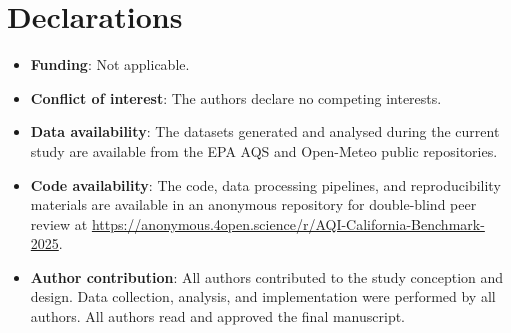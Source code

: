 \documentclass[pdflatex,sn-mathphys-num]{sn-jnl}
\begin{document}
\section*{Declarations}
\begin{itemize}
\item \textbf{Funding}: Not applicable.
\item \textbf{Conflict of interest}: The authors declare no competing interests.
\item \textbf{Data availability}: The datasets generated and analysed during the current study are available from the EPA AQS and Open-Meteo public repositories.
\item \textbf{Code availability}: The code, data processing pipelines, and reproducibility materials are available in an anonymous repository for double-blind peer review at \url{https://anonymous.4open.science/r/AQI-California-Benchmark-2025}.
\item \textbf{Author contribution}: All authors contributed to the study conception and design. Data collection, analysis, and implementation were performed by all authors. All authors read and approved the final manuscript.
\end{itemize}


\end{document}
